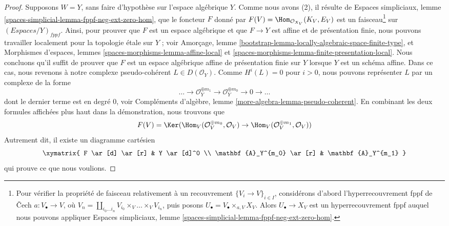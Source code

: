 \begin{proof}
\medskip\noindent
Supposons $W = Y$, sans faire d'hypothèse sur l'espace algébrique $Y$.
Comme nous avons (2), il résulte de
Espaces simpliciaux, lemme
\ref{spaces-simplicial-lemma-fppf-neg-ext-zero-hom}, que le foncteur $F$ donné
par $F(V) = \Hom_{\mathcal{O}_{X_V}}(K_V, E_V)$ est un
faisceau\footnote{Pour vérifier la propriété de faisceau relativement à un
recouvrement $\{V_i \to V\}_{i \in I}$, considérons d'abord
l'hyperrecouvrement fppf de {\v C}ech $a : V_\bullet \to V$, où
$V_n = \coprod_{i_0 \ldots i_n} V_{i_0} \times_V \ldots \times_V V_{i_n}$,
puis posons $U_\bullet = V_\bullet \times_{a, V} X_V$. Alors
$U_\bullet \to X_V$ est un hyperrecouvrement fppf auquel nous pouvons
appliquer Espaces simpliciaux, lemme
\ref{spaces-simplicial-lemma-fppf-neg-ext-zero-hom}.}
sur $(\textit{Espaces}/Y)_{fppf}$. Ainsi, pour prouver que $F$ est un espace
algébrique et que $F \to Y$ est affine et de présentation finie, nous pouvons
travailler localement pour la topologie \'etale sur $Y$ ; voir
Amorçage, lemme \ref{bootstrap-lemma-locally-algebraic-space-finite-type}, et
Morphismes d'espaces, lemmes \ref{spaces-morphisms-lemma-affine-local} et
\ref{spaces-morphisms-lemma-finite-presentation-local}.
Nous concluons qu'il suffit de prouver que $F$ est un espace algébrique affine
de présentation finie sur $Y$ lorsque $Y$ est un schéma affine. Dans ce cas,
nous revenons à notre complexe pseudo-cohérent $L \in D(\mathcal{O}_Y)$.
Comme $H^i(L) = 0$ pour $i > 0$, nous pouvons représenter $L$ par un complexe
de la forme
$$
\ldots \to \mathcal{O}_Y^{\oplus m_1} \to \mathcal{O}_Y^{\oplus m_0}
\to 0 \to \ldots
$$
dont le dernier terme est en degré $0$, voir Compléments d'algèbre, lemme
\ref{more-algebra-lemma-pseudo-coherent}. En combinant les deux formules
affichées plus haut dans la démonstration, nous trouvons que
$$
F(V) =
\Ker(
\Hom_V(\mathcal{O}_V^{\oplus m_0}, \mathcal{O}_V)
\to 
\Hom_V(\mathcal{O}_V^{\oplus m_1}, \mathcal{O}_V)
)
$$
Autrement dit, il existe un diagramme cartésien
$$
\xymatrix{
F \ar[d] \ar[r] & Y \ar[d]^0 \\
\mathbf{A}_Y^{m_0} \ar[r] & \mathbf{A}_Y^{m_1}
}
$$
qui prouve ce que nous voulions.
\end{proof}

